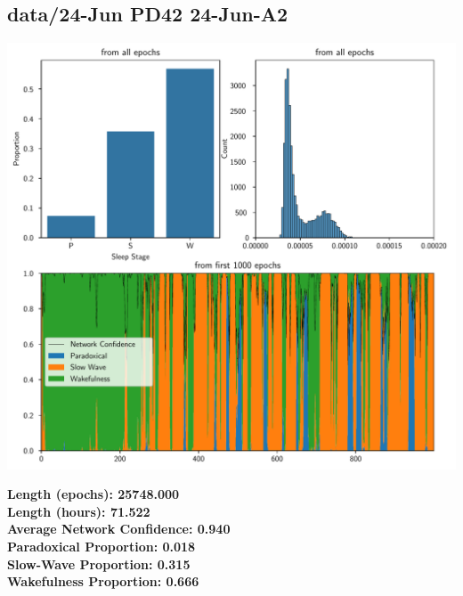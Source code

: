         \subsection*{ data/24-Jun PD42 24-Jun-A2 }
        \begin{center}
        \begin{adjustbox}{width=1\textwidth}
        \includegraphics[page=27]{figs.pdf}
        \end{adjustbox}
        \end{center}
        \large\textbf{Length (epochs): 25748.000}\\
        \textbf{Length (hours): 71.522}\\
        \textbf{Average Network Confidence: 0.940}\\
        \textbf{Paradoxical Proportion: 0.018}\\
        \textbf{Slow-Wave Proportion: 0.315}\\
        \textbf{Wakefulness Proportion: 0.666}\\
        
